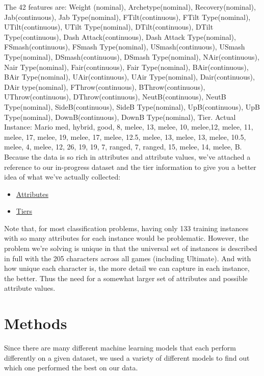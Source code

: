 \documentclass{article}
\begin{document}
The 42 features are: 
Weight (nominal), Archetype(nominal), Recovery(nominal), Jab(continuous), Jab Type(nominal), FTilt(continuous), FTilt Type(nominal), UTilt(continuous), UTilt Type(nominal), DTilt(continuous), DTilt Type(continuous), Dash Attack(continuous), Dash Attack Type(nominal), FSmash(continuous), FSmash Type(nominal), USmash(continuous), USmash Type(nominal), DSmash(continuous), DSmash Type(nominal), NAir(continuous), Nair Type(nominal), Fair(continuous), Fair Type(nominal), BAir(continuous), BAir Type(nominal), UAir(continuous), UAir Type(nominal), Dair(continuous), DAir type(nominal), FThrow(continuous), BThrow(continuous), UThrow(continuous), DThrow(continuous), NeutB(continuous), NeutB Type(nominal), SideB(continuous), SideB Type(nominal), UpB(continuous), UpB Type(nominal), DownB(continuous), DownB Type(nominal), Tier.    
\linebreak
Actual Instance: Mario
med, hybrid, good, 8, melee, 13, melee, 10, melee,12, melee, 11, melee, 17, melee, 19, melee, 17, melee, 12.5, melee, 13, melee, 13, melee, 10.5, melee,  4,  melee, 12, 26, 19, 19, 7, ranged, 7, ranged, 15, melee, 14, melee, B.
Because the data is so rich in attributes and attribute values, we’ve attached a reference to our in-progress dataset  and the tier information to give you a better idea of what we’ve actually collected:
\begin{itemize}
  \item\href{https://docs.google.com/spreadsheets/d/103elr0mhpr14yhiLLib4\_KinrFvMXrBGhfcc1fdAJjE/edit?usp=sharing}{Attributes}
  \item\href{https://docs.google.com/spreadsheets/d/18\_zleVDd54rsXNylzEztfFuTKHLIQ6wrmeXgQ1AGhSc/edit?usp=sharing}{Tiers}
\end{itemize}
Note that, for most classification problems, having only 133 training instances with so many attributes for each instance would be problematic. However, the problem we’re solving is unique in that the universal set of instances is described in full with the 205 characters across all games (including Ultimate). And with how unique each character is, the more detail we can capture in each instance, the better. Thus the need for a somewhat larger set of attributes and possible attribute values. 

\section{Methods}

Since there are many different machine learning models that each perform differently on a given dataset, we used a variety of different models to find out which one performed the best on our data.
\end{document}
